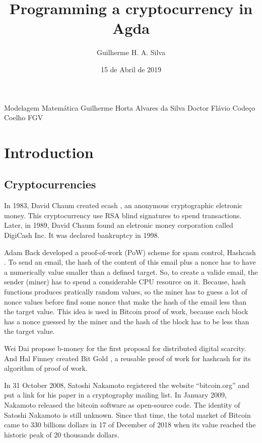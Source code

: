 \documentclass[12pt]{article}
\title{Programming a cryptocurrency in Agda}
\author{Guilherme H. A. Silva}
\date{15 de Abril de 2019}
\begin{document}

          {Modelagem Matemática}
          {Guilherme Horta Alvares da Silva}
          {Doctor Flávio Codeço Coelho}
          {FGV}


\tableofcontents
\pagebreak

\renewcommand{\thesection}{\arabic{section}}
\section{Introduction}

\subsection{Cryptocurrencies}

In 1983, David Chaum created ecash \cite{panurach1996money} , an anonymous cryptographic eletronic money.
This cryptocurrency use RSA blind signatures \cite{chaum1983blind} to spend transactions.
Later, in 1989, David Chaum found an eletronic money corporation called DigiCash Inc.
It was declared bankruptcy in 1998.

Adam Back developed a proof-of-work (PoW) scheme for spam control, Hashcash \cite{back2002hashcash}.
To send an email, the hash of the content of this email plus a nonce has to have a numerically value
smaller than a defined target.
So, to create a valide email, the sender (miner) has to spend a considerable CPU resource on it.
Because, hash functions produces pratically random values, so the miner has to guess a lot of nonce
values before find some nonce that make the hash of the email less than the target value.
This idea is used in Bitcoin proof of work, because each block has a nonce guessed by the miner and
the hash of the block has to be less than the target value.

Wei Dai propose b-money \cite{dai1998b} for the first proposal for distributed digital scarcity.
And Hal Finney created Bit Gold \cite{wallace2011rise}, a reusable proof of work for hashcash for
its algorithm of proof of work.

In 31 October 2008, Satoshi Nakamoto registered the website ``bitcoin.org'' and put a link for his paper \cite{nakamoto2008bitcoin} in a cryptography mailing list.
In January 2009, Nakamoto released the bitcoin software as open-source code.
The identity of Satoshi Nakamoto is still unknown.
Since that time, the total market of Bitcoin came to 330 billions dollars in 17 of December of 2018
when its value reached the historic peak of 20 thousands dollars.
\end{document}
